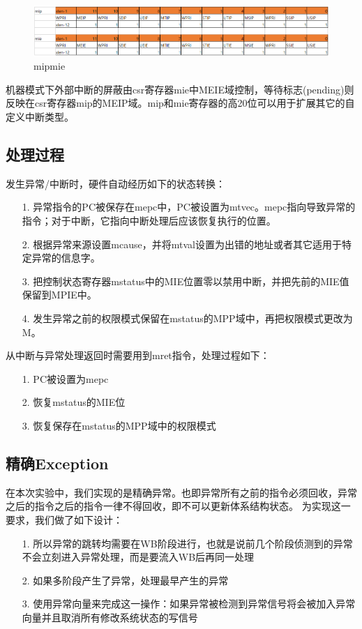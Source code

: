 \begin{figure}[H] %
    \centering %
    \includegraphics[width=1.0\textwidth]{figs/mipmie.png} %
    \caption{mipmie} %
    \label{Fig.9} %
\end{figure}

机器模式下外部中断的屏蔽由csr寄存器mie中MEIE域控制，等待标志(pending)则反映在csr寄存器mip的MEIP域。mip和mie寄存器的高20位可以用于扩展其它的自定义中断类型。

\subsection{处理过程}
发生异常/中断时，硬件自动经历如下的状态转换：
\begin{itemize}
    \item [1.] 异常指令的PC被保存在mepc中，PC被设置为mtvec。mepc指向导致异常的指令；对于中断，它指向中断处理后应该恢复执行的位置。
    \item [2.] 根据异常来源设置mcause，并将mtval设置为出错的地址或者其它适用于特定异常的信息字。
    \item [3.] 把控制状态寄存器mstatus中的MIE位置零以禁用中断，并把先前的MIE值保留到MPIE中。
    \item [4.] 发生异常之前的权限模式保留在mstatus的MPP域中，再把权限模式更改为M。
\end{itemize}

从中断与异常处理返回时需要用到mret指令，处理过程如下：
\begin{itemize}
    \item [1.] PC被设置为mepc
    \item [2.] 恢复mstatus的MIE位
    \item [3.] 恢复保存在mstatus的MPP域中的权限模式
\end{itemize}

\subsection{精确Exception}
在本次实验中，我们实现的是精确异常。也即异常所有之前的指令必须回收，异常之后的指令之后的指令一律不得回收，即不可以更新体系结构状态。
为实现这一要求，我们做了如下设计：
\begin{itemize}
    \item [1.] 所以异常的跳转均需要在WB阶段进行，也就是说前几个阶段侦测到的异常不会立刻进入异常处理，而是要流入WB后再同一处理
    \item [2.] 如果多阶段产生了异常，处理最早产生的异常
    \item [3.] 使用异常向量来完成这一操作：如果异常被检测到异常信号将会被加入异常向量并且取消所有修改系统状态的写信号
\end{itemize}

